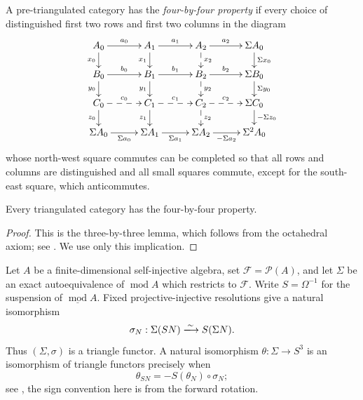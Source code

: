 \documentclass[a4paper,reqno,10pt]{amsart}
\numberwithin{equation}{section}
\DeclareMathOperator{\modu}{mod}
\newcommand{\cF}{\mathcal F}
\newcommand{\ol}[1]{\underline{#1}}
\begin{document}
\begin{definition}\label{def:fixed-boundary}
A pre-triangulated category has the \emph{four-by-four property} if every choice of distinguished first two rows and first two
columns in the diagram
\[
\xymatrix@C=27pt@R=15pt{
A_0\ar[r]^-{a_0}\ar[d]_-{x_0}&
A_1\ar[r]^-{a_1}\ar[d]_-{x_1}&
A_2\ar[r]^-{a_2}\ar@{-->}[d]^-{x_2}&
\Sigma A_0\ar[d]^-{\Sigma x_0}\\
B_0\ar[r]^-{b_0}\ar[d]_-{y_0}&
B_1\ar[r]^-{b_1}\ar[d]_-{y_1}&
B_2\ar[r]^-{b_2}\ar@{-->}[d]^-{y_2}&
\Sigma B_0\ar[d]^-{\Sigma y_0}\\
C_0\ar@{-->}[r]^-{c_0}\ar[d]_-{z_0}&
C_1\ar@{-->}[r]^-{c_1}\ar[d]_-{z_1}&
C_2\ar@{-->}[r]^-{c_2}\ar@{-->}[d]^-{z_2}&
\Sigma C_0\ar[d]^-{-\Sigma z_0}\\
\Sigma A_0\ar[r]_-{\Sigma a_0}&
\Sigma A_1\ar[r]_-{\Sigma a_1}&
\Sigma A_2\ar[r]_-{-\Sigma a_2}&
\Sigma^2 A_0
}
\]
whose north-west square commutes can be completed so that all rows and
columns are distinguished and all small squares commute, except for the
south-east square, which anticommutes.
\end{definition}

\begin{lemma}\label{lem:tr4-implies-fixed-boundary}
Every triangulated category has the four-by-four property.
\end{lemma}

\begin{proof}
This is the three-by-three lemma, which follows from the octahedral axiom;
see \cite[Lemma~2.6]{May2001}. We use only this implication.
\end{proof}

\begin{convention}\label{conv:heller-coherence}
Let $A$ be a finite-dimensional self-injective algebra, set
$\cF=\mathcal P(A)$, and let $\Sigma$ be an exact autoequivalence of
$\modu A$ which restricts to $\cF$. Write $S=\Omega^{-1}$ for the
suspension of $\ol{\modu}A$. Fixed projective-injective resolutions give a
natural isomorphism
\[
 \sigma_N:\Sigma(SN)\xlongrightarrow{\sim}S(\Sigma N).
\]
Thus $(\Sigma,\sigma)$ is a triangle functor. A natural isomorphism
$\theta:\Sigma\longrightarrow S^3$ is an isomorphism of triangle functors
precisely when
\begin{equation}\label{eq:triangle-functor-compatibility}
 \theta_{SN}=-S(\theta_N)\circ\sigma_N;
\end{equation}
see \cite[Theorem~16.4]{Heller1968}, the sign convention here is from the forward rotation.
\end{convention}
\end{document}
